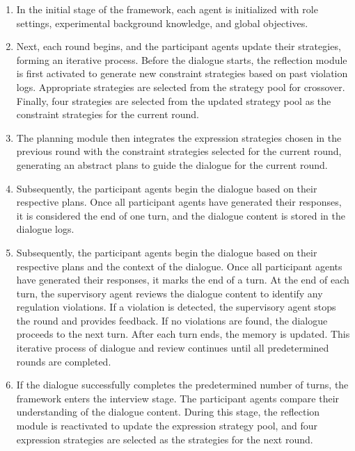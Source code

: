 \begin{enumerate}
\item In the initial stage of the framework, each agent is initialized with role settings, experimental background knowledge, and global objectives.

\item Next, each round begins, and the participant agents update their strategies, forming an iterative process. Before the dialogue starts, the reflection module is first activated to generate new constraint strategies based on past violation logs. Appropriate strategies are selected from the strategy pool for crossover. Finally, four strategies are selected from the updated strategy pool as the constraint strategies for the current round.

\item The planning module then integrates the expression strategies chosen in the previous round with the constraint strategies selected for the current round, generating an abstract plans to guide the dialogue for the current round.

\item Subsequently, the participant agents begin the dialogue based on their respective plans. Once all participant agents have generated their responses, it is considered the end of one turn, and the dialogue content is stored in the dialogue logs.

\item Subsequently, the participant agents begin the dialogue based on their respective plans and the context of the dialogue. Once all participant agents have generated their responses, it marks the end of a turn. At the end of each turn, the supervisory agent reviews the dialogue content to identify any regulation violations. If a violation is detected, the supervisory agent stops the round and provides feedback. If no violations are found, the dialogue proceeds to the next turn. After each turn ends, the memory is updated. This iterative process of dialogue and review continues until all predetermined rounds are completed.

\item If the dialogue successfully completes the predetermined number of turns, the framework enters the interview stage. The participant agents compare their understanding of the dialogue content. During this stage, the reflection module is reactivated to update the expression strategy pool, and four expression strategies are selected as the strategies for the next round.
\end{enumerate}


